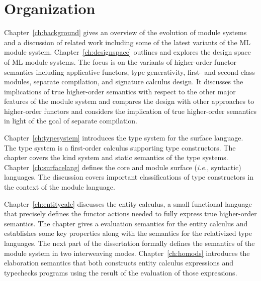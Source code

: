 
\section{Organization}

Chapter~\ref{ch:background} gives an overview of the evolution of module systems and a discussion of related work including some of the latest variants of the ML module system. Chapter~\ref{ch:designspace} outlines and explores the design space of ML module systems. The focus is on the variants of higher-order functor semantics including applicative functors, type generativity, first- and second-class modules, separate compilation, and signature calculus design. It discusses the implications of true higher-order semantics with respect to the other major features of the module system and compares the design with other approaches to higher-order functors  and considers the implication of true higher-order semantics in light of the goal of separate compilation.  

Chapter~\ref{ch:typesystem} introduces the type system for the surface language. The type system is a first-order calculus supporting type constructors. The chapter covers the kind system and static semantics of the type systems. Chapter~\ref{ch:surfacelang} defines the core and module surface (\emph{i.e.}, syntactic) languages. The discussion covers important classifications of type constructors in the context of the module language. 

Chapter~\ref{ch:entitycalc} discusses the entity calculus, a small functional language that precisely defines the functor actions needed to fully express true higher-order semantics. The chapter gives a evaluation semantics for the entity calculus and establishes some key properties along with the semantics for the relativized type languages. The next part of the dissertation formally defines the semantics of the module system in two interweaving modes. Chapter~\ref{ch:homods} introduces the elaboration semantics that both constructs entity calculus expressions and typechecks programs using the result of the evaluation of those expressions. 

